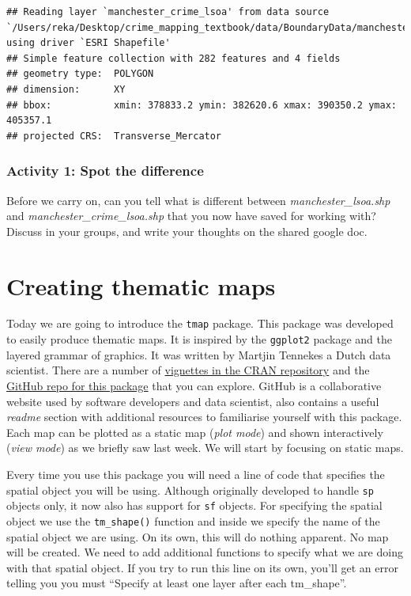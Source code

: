 \documentclass[
]{book}
\begin{document}
\begin{verbatim}
## Reading layer `manchester_crime_lsoa' from data source `/Users/reka/Desktop/crime_mapping_textbook/data/BoundaryData/manchester_crime_lsoa.shp' using driver `ESRI Shapefile'
## Simple feature collection with 282 features and 4 fields
## geometry type:  POLYGON
## dimension:      XY
## bbox:           xmin: 378833.2 ymin: 382620.6 xmax: 390350.2 ymax: 405357.1
## projected CRS:  Transverse_Mercator
\end{verbatim}

\hypertarget{activity-1-spot-the-difference}{%
\subsubsection{Activity 1: Spot the difference}\label{activity-1-spot-the-difference}}

Before we carry on, can you tell what is different between \emph{manchester\_lsoa.shp} and \emph{manchester\_crime\_lsoa.shp} that you now have saved for working with? Discuss in your groups, and write your thoughts on the shared google doc.

\hypertarget{creating-thematic-maps}{%
\section{Creating thematic maps}\label{creating-thematic-maps}}

Today we are going to introduce the \texttt{tmap} package. This package was developed to easily produce thematic maps. It is inspired by the \texttt{ggplot2} package and the layered grammar of graphics. It was written by Martjin Tennekes a Dutch data scientist. There are a number of \href{https://cran.r-project.org/web/packages/tmap/index.html}{vignettes in the CRAN repository} and the \href{https://github.com/mtennekes/tmap}{GitHub repo for this package} that you can explore. GitHub is a collaborative website used by software developers and data scientist, also contains a useful \emph{readme} section with additional resources to familiarise yourself with this package. Each map can be plotted as a static map (\emph{plot mode}) and shown interactively (\emph{view mode}) as we briefly saw last week. We will start by focusing on static maps.

Every time you use this package you will need a line of code that specifies the spatial object you will be using. Although originally developed to handle \texttt{sp} objects only, it now also has support for \texttt{sf} objects. For specifying the spatial object we use the \texttt{tm\_shape()} function and inside we specify the name of the spatial object we are using. On its own, this will do nothing apparent. No map will be created. We need to add additional functions to specify what we are doing with that spatial object. If you try to run this line on its own, you'll get an error telling you you must ``Specify at least one layer after each tm\_shape''.
\end{document}
